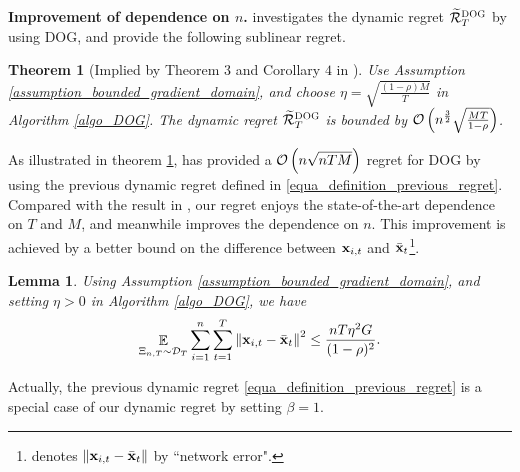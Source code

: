 \documentclass{article}
\newtheorem{Theorem}{\bf{Theorem}}
\newtheorem{Lemma}{\bf{Lemma}}
\begin{document}
\textbf{Improvement of dependence on $n$.}  \citet{8015179Shahram} investigates the dynamic regret $\widetilde{{\mathcal{R}}}_T^{\textsc{DOG}}$ by using DOG, and provide the following sublinear regret.
\begin{Theorem}[Implied by Theorem $3$ and Corollary $4$ in \citet{8015179Shahram}]
\label{theorem_privious_dog_regret}
Use Assumption \ref{assumption_bounded_gradient_domain}, and choose $\eta = \sqrt{\frac{(1-\rho) M}{T}}$ in Algorithm \ref{algo_DOG}. The dynamic regret $\widetilde{{\mathcal{R}}}_T^{\textsc{DOG}}$ is bounded by ${\mathcal{O}\left( n^{\frac{3}{2}}\sqrt{\frac{MT}{1-\rho}}  \right)}$.
\end{Theorem}

As illustrated in theorem \ref{theorem_privious_dog_regret},   \citet{8015179Shahram} has provided a ${\mathcal{O}\left( n\sqrt{nTM} \right)}$ regret for DOG by using the previous dynamic regret defined in \eqref{equa_definition_previous_regret}. Compared with the result in \citet{8015179Shahram}, our regret enjoys the state-of-the-art dependence on $T$ and $M$, and meanwhile improves the dependence on $n$. This improvement is achieved by a better bound on the difference between ${\bf x}_{i,t}$ and $\bar{{\bf x}}_t$\footnote{\citet{8015179Shahram} denotes $\left\lVert{\bf x}_{i,t} - \bar{{\bf x}}_t\right\rVert$ by ``network error".}.
\begin{Lemma}
\label{lemma_x_variance_norm_square}
Using Assumption \ref{assumption_bounded_gradient_domain}, and setting $\eta>0$ in Algorithm \ref{algo_DOG}, we have 
\begin{align}
\nonumber
\mathop{\mathbb{E}}_{ \Xi_{n,T} \sim \mathcal{D}_{T} } \sum_{i=1}^n\sum_{t=1}^T \left\lVert{\bf x}_{i,t} - \bar{{\bf x}}_t\right\rVert^2 \le \frac{nT\eta^2 G }{(1-\rho)^2}.
\end{align}
\end{Lemma}
Actually, the previous dynamic regret \eqref{equa_definition_previous_regret} is a special case of our dynamic regret  by setting $\beta = 1$.
\end{document}
